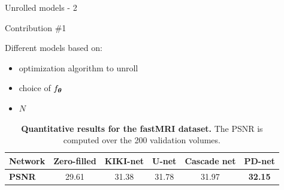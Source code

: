 \begin{frame}{Unrolled models - 2}
    \begin{exampleblock}{Contribution \#1}
    \end{exampleblock}
    Different models based on:
    \begin{itemize}
        \item optimization algorithm to unroll
        \item choice of $f_{{\boldsymbol{\theta}}}$
        \item $N$
    \end{itemize}
    \pause

    \begin{overprint}


        \vspace{-1em}
        \begin{table}[h]
            \centering
            \caption{\textbf{Quantitative results for the fastMRI dataset.} The PSNR is computed over the 200 validation volumes.}
            \label{tab:quanti-fastmri}
            \vspace{-0.5em}
            \begin{tabular}{l|c|c|c|c|c}
            \textbf{Network} & \textbf{Zero-filled} & \textbf{KIKI-net} & \textbf{U-net} & \textbf{Cascade net} & \textbf{PD-net}\footnotemark \\ \hline
            \textbf{PSNR} & 29.61 & 31.38 & 31.78 & 31.97 & \textbf{32.15}
            \end{tabular}%
            \end{table}

\end{overprint}



\end{frame}

